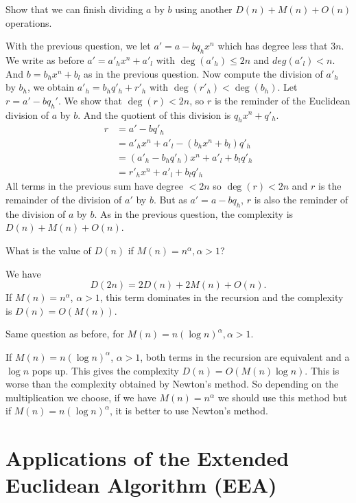 \documentclass[11pt]{exam}
\theoremstyle{definition}
\begin{document}
{\begin{questions}
	\question Show that we can finish dividing $a$ by $b$ using another $D(n)+M(n)+O(n)$ operations.
	\begin{solution}
		With the previous question, we let $a' = a - b q_h x^n$ which has degree less that $3n$. We write as before $a' = a'_h x^n + a'_l$ with $\deg(a'_h) \leq 2n$ and $deg(a'_l) < n$. And $b = b_h x^n + b_l$ as in the previous question.
		Now compute the division of $a'_h$ by $b_h$, we obtain $a'_h = b_h q'_h + r'_h$ with $\deg(r'_h) < \deg(b_h)$. Let $r = a'-bq_h'$. We show that $\deg(r) < 2n$, so $r$ is the reminder of the Euclidean division of $a$ by $b$. And the quotient of this division is $q_h x^n + q'_h$.
		\begin{align*}
		r &= a' - b q'_h \\
		&= a'_h x^{n} + a'_l - (b_h x^n + b_l) q'_h \\
		&= (a'_h - b_h q'_h) x^{n} + a'_l + b_l q'_h\\
		&= r'_h x^{n} + a'_l + b_l q'_h
		\end{align*}
		All terms in the previous sum have degree $< 2n$ so $\deg(r) < 2n$ and $r$ is the remainder of the division of $a'$ by $b$. But as $a' = a - b q_h$, $r$ is also the reminder of the division of $a$ by $b$.
		As in the previous question, the complexity is $D(n) + M(n) + O(n)$.
	\end{solution}
	
	
	\question What is the value of $D(n)$ if $M(n)=n^\alpha, \alpha > 1$?
	\begin{solution}
		We have $$D(2n) = 2D(n) + 2M(n) + O(n).$$
		If $M(n) = n^{\alpha}$, $\alpha > 1$, this term dominates in the recursion and the complexity is $D(n) = O(M(n))$.
	\end{solution}
	
	
	\question Same question as before,  for $M(n)=n(\log n)^\alpha, \alpha>1$. 
	\begin{solution}
		If $M(n) = n(\log n)^{\alpha}$, $\alpha > 1$, both terms in the recursion are equivalent and a $\log n$ pops up. This gives the complexity $D(n) = O(M(n) \log n)$. This is worse than the complexity obtained by Newton's method.
		So depending on the multiplication we choose, if we have $M(n) = n^\alpha$ we should use this method but if $M(n) = n(\log n)^\alpha$, it is better to use Newton's method.
	\end{solution}
\end{questions}

\section{Applications of the Extended Euclidean Algorithm (EEA)}

}
\end{document}
